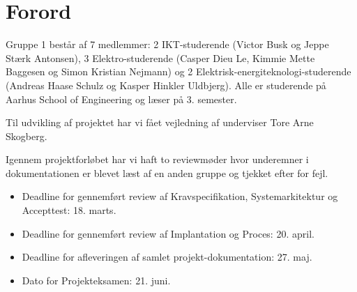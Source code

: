 \chapter{Forord}

Gruppe 1 består af 7 medlemmer: 2 IKT-studerende (Victor Busk og Jeppe Stærk Antonsen), 3 Elektro-studerende (Casper Dieu Le, Kimmie Mette Baggesen og Simon Kristian Nejmann) og 2 Elektrisk-energiteknologi-studerende (Andreas Haase Schulz og Kasper Hinkler Uldbjerg). Alle er studerende på Aarhus School of Engineering og læser på 3. semester.

Til udvikling af projektet har vi fået vejledning af underviser Tore Arne Skogberg.

Igennem projektforløbet har vi haft to reviewmøder hvor underemner i dokumentationen er blevet læst af en anden gruppe og tjekket efter for fejl.

\begin{itemize}
    \item Deadline for gennemført review af Kravspecifikation, Systemarkitektur og Accepttest: 18. marts.
    \item Deadline for gennemført review af Implantation og Proces: 20. april.
    \item Deadline for afleveringen af samlet projekt-dokumentation: 27. maj.
    \item Dato for Projekteksamen: 21. juni.
\end{itemize}